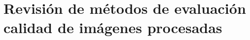 \chapter[Evaluación de calidad de imágenes procesadas]{Revisión de métodos de evaluación calidad de imágenes procesadas}